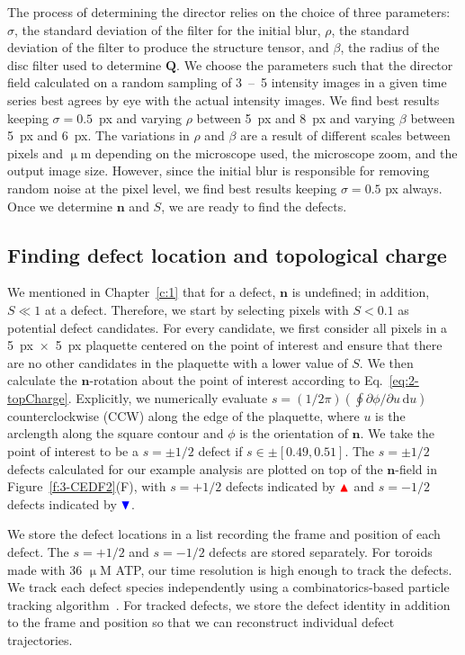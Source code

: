The process of determining the director relies on the choice of three parameters: $\sigma$, the standard deviation of the filter for the initial blur, $\rho$, the standard deviation of the filter to produce the structure tensor, and $\beta$, the radius of the disc filter used to determine $\mathbf{Q}$.
We choose the parameters such that the director field calculated on a random sampling of 3~--~5 intensity images in a given time series best agrees by eye with the actual intensity images.
We find best results keeping $\sigma = 0.5$~px and varying $\rho$ between 5~px and 8~px and varying $\beta$ between 5~px and 6~px.
The variations in $\rho$ and $\beta$ are a result of different scales between pixels and $\upmu$m depending on the microscope used, the microscope zoom, and the output image size.
However, since the initial blur is responsible for removing random noise at the pixel level, we find best results keeping $\sigma = 0.5$ px always.
Once we determine $\mathbf{n}$ and $S$, we are ready to find the defects.


\subsection{Finding defect location and topological charge}
We mentioned in Chapter~\ref{c:1} that for a defect, $\mathbf{n}$ is undefined; in addition, $S \ll 1$ at a defect.
Therefore, we start by selecting pixels with $S < 0.1$ as potential defect candidates.
For every candidate, we first consider all pixels in a 5~px~$\times$~5~px plaquette centered on the point of interest and ensure that there are no other candidates in the plaquette with a lower value of $S$.
We then calculate the $\mathbf{n}$-rotation about the point of interest according to Eq.~\ref{eq:2-topCharge}.
Explicitly, we numerically evaluate $s = (1 / 2 \pi)(\oint \partial\phi / \partial u \, \textrm{d}u)$ counterclockwise (CCW) along the edge of the plaquette, where $u$ is the arclength along the square contour and $\phi$ is the orientation of $\mathbf{n}$.
We take the point of interest to be a $s = \pm 1/2$ defect if $s \in \pm [0.49,0.51]$.
The $s=\pm1/2$ defects calculated for our example analysis are plotted on top of the $\mathbf{n}$-field in Figure~\ref{f:3-CEDF2}(F), with $s = +1/2$ defects indicated by ${\color{red} \blacktriangle } $  and $s = -1/2$ defects indicated by ${ \color{blue} \blacktriangledown } $.

We store the defect locations in a list recording the frame and position of each defect.
The $s = +1/2$ and $s = -1/2$ defects are stored separately.
For toroids made with 36 $\upmu$M ATP, our time resolution is high enough to track the defects.
We track each defect species independently using a combinatorics-based particle tracking algorithm~\cite{RN54}.
For tracked defects, we store the defect identity in addition to the frame and position so that we can reconstruct individual defect trajectories.


